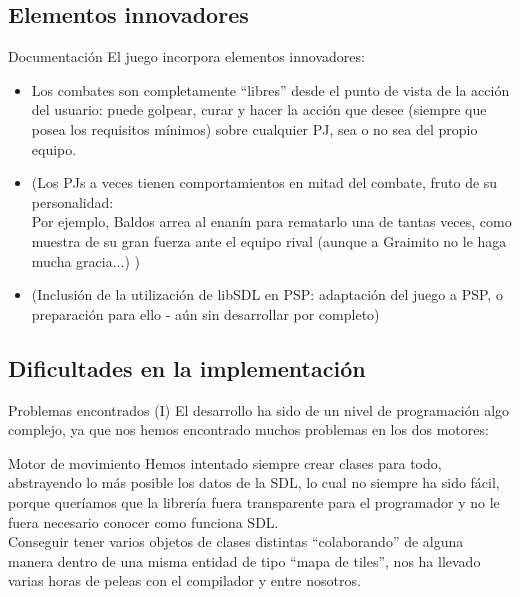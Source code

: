 \documentclass[9pt,xcolor=svgnames]{beamer}
\begin{document}
  \subsection{Elementos innovadores}

   \begin{frame}{Documentación}
    El juego incorpora elementos innovadores:
    \begin{itemize}
     \item Los combates son completamente ``libres'' desde el punto de
	   vista de la acción del usuario: puede golpear, curar y hacer
	   la acción que desee (siempre que posea los requisitos
	   mínimos) sobre cualquier PJ, sea o no sea del propio equipo.\\

     \item (Los PJs a veces tienen comportamientos en mitad del combate,
	   fruto de su personalidad:\\
	   Por ejemplo, Baldos arrea al enanín para rematarlo una de
	   tantas veces, como muestra de su gran fuerza ante el equipo
	   rival (aunque a Graimito no le haga mucha gracia...) )

     \item (Inclusión de la utilización de libSDL en PSP: adaptación del
	   juego a PSP, o preparación para ello - aún sin desarrollar
	   por completo)

    \end{itemize}
   \end{frame}

   \subsection{Dificultades en la implementación}

   \begin{frame}{Problemas encontrados (I)}
   El desarrollo ha sido de un nivel de programación algo complejo, ya que
   nos hemos encontrado muchos problemas en los dos motores:

   \begin{block}{Motor de movimiento}
     Hemos intentado siempre crear clases para todo, abstrayendo lo más posible
     los datos de la SDL, lo cual no siempre ha sido fácil, porque queríamos
     que la librería fuera transparente para el programador y no le fuera
     necesario conocer como funciona SDL.\\

     Conseguir tener varios objetos de clases distintas ``colaborando'' de
     alguna manera dentro de una misma entidad de tipo ``mapa de tiles'', nos
     ha llevado varias horas de peleas con el compilador y entre nosotros.
   \end{block}
   
   \end{frame}
\end{document}
